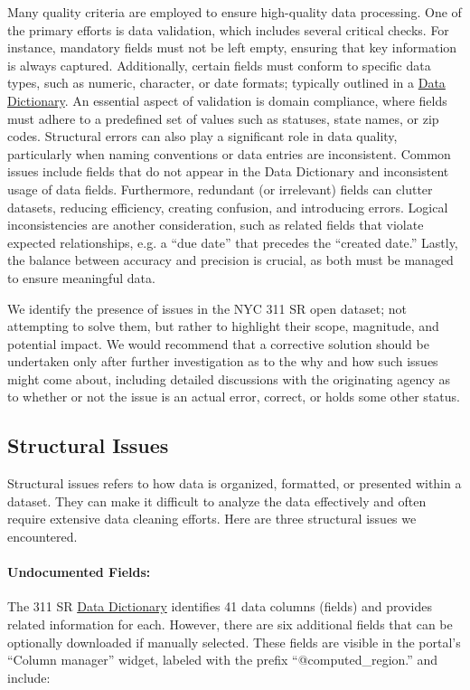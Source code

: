 \documentclass[linenumber]{jdsart}
\begin{document}
Many quality criteria are employed to ensure high\mbox{-}quality data 
processing. One of the primary efforts is data validation, which includes 
several critical checks. For instance, mandatory fields must not be 
left empty, ensuring that key information is always captured. 
Additionally, certain fields must conform to specific data types, 
such as numeric, character, or date formats; typically 
outlined in a \href{https://data.cityofnewyork.us/api/views/erm2-nwe9/files/b372b884-f86a-453b-ba16-1fe06ce9d212?download=true&filename=311_ServiceRequest_2010-Present_DataDictionary_Updated_2023.xlsx}{Data Dictionary}. An 
essential aspect of validation is domain compliance, where 
fields must adhere to a predefined set of 
values such as statuses, state names, or zip codes. Structural 
errors can also play a significant role in data quality, particularly when 
naming conventions or data entries are inconsistent. Common issues 
include fields that do not appear in the Data Dictionary and  
inconsistent usage of data fields. Furthermore, redundant 
(or irrelevant) fields can clutter datasets, reducing efficiency, 
creating confusion, and introducing errors. Logical inconsistencies 
are another consideration, such as related fields that violate expected 
relationships, e.g. a ``due date'' that precedes the ``created date.'' 
Lastly, the balance between accuracy and precision is crucial, as both 
must be managed to ensure meaningful data.


We identify the presence of issues in the NYC 311 SR open dataset;
not attempting to solve them, but rather to highlight their scope, 
magnitude, and potential impact. We would recommend 
that a corrective solution should be undertaken only 
after further investigation as to the why and how such 
issues might come about, including  detailed discussions 
with the originating agency as to whether or not the issue is an 
actual error, correct,  or holds some other status.


\subsection{Structural Issues}
\label{sec:structural}
Structural issues refers to how data is organized, formatted, 
or presented within a dataset. They can make 
it difficult to analyze the data effectively and often require extensive 
data cleaning efforts. Here are three structural issues we encountered.
 
\paragraph{Undocumented Fields:} The 311 SR 
\href{https://data.cityofnewyork.us/api/views/erm2-nwe9/files/b372b884-f86a-453b-ba16-1fe06ce9d212?download=true&filename=311_ServiceRequest_2010-Present_DataDictionary_Updated_2023.xlsx}{Data Dictionary} 
identifies 41 data columns (fields) and provides related information 
for each. However, there are six additional fields that can be
optionally downloaded if manually selected. These fields are 
visible in the portal's ``Column manager'' widget, labeled with the prefix 
``@computed\_region.'' and include:
\end{document}
